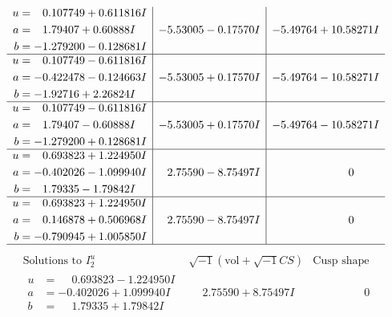 \documentclass[1p]{elsarticle_modified}
\theoremstyle{definition}
\newcommand{\I}{\sqrt{-1}}
\begin{document}
$$\begin{array}{c|c|c}
\begin{aligned}
u &= \phantom{-}0.107749 + 0.611816 I \\
a &= \phantom{-}1.79407 + 0.60888 I \\
b &= -1.279200 - 0.128681 I\end{aligned}
 & -5.53005 - 0.17570 I & -5.49764 + 10.58271 I \\ \hline\begin{aligned}
u &= \phantom{-}0.107749 - 0.611816 I \\
a &= -0.422478 - 0.124663 I \\
b &= -1.92716 + 2.26824 I\end{aligned}
 & -5.53005 + 0.17570 I & -5.49764 - 10.58271 I \\ \hline\begin{aligned}
u &= \phantom{-}0.107749 - 0.611816 I \\
a &= \phantom{-}1.79407 - 0.60888 I \\
b &= -1.279200 + 0.128681 I\end{aligned}
 & -5.53005 + 0.17570 I & -5.49764 - 10.58271 I \\ \hline\begin{aligned}
u &= \phantom{-}0.693823 + 1.224950 I \\
a &= -0.402026 - 1.099940 I \\
b &= \phantom{-}1.79335 - 1.79842 I\end{aligned}
 & \phantom{-}2.75590 - 8.75497 I & \phantom{-0.000000 } 0 \\ \hline\begin{aligned}
u &= \phantom{-}0.693823 + 1.224950 I \\
a &= \phantom{-}0.146878 + 0.506968 I \\
b &= -0.790945 + 1.005850 I\end{aligned}
 & \phantom{-}2.75590 - 8.75497 I & \phantom{-0.000000 } 0\\
 \hline 
 \end{array}$$\newpage$$\begin{array}{c|c|c}  
\text{Solutions to }I^u_{2}& \I (\text{vol} + \sqrt{-1}CS) & \text{Cusp shape}\\
 \hline 
\begin{aligned}
u &= \phantom{-}0.693823 - 1.224950 I \\
a &= -0.402026 + 1.099940 I \\
b &= \phantom{-}1.79335 + 1.79842 I\end{aligned}
 & \phantom{-}2.75590 + 8.75497 I & \phantom{-0.000000 } 0 \\ \hline\begin{aligned}

\end{aligned}
\end{array}$$
\end{document}
